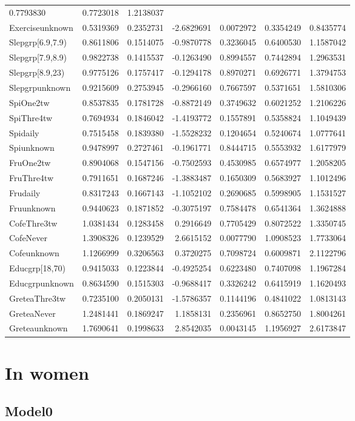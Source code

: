 \documentclass[]{article}
\begin{document}
\begin{longtable}[]{@{}lrrrrrr@{}}
0.7793830 & 0.7723018 & 1.2138037\tabularnewline
Exerciseunknown & 0.5319369 & 0.2352731 & -2.6829691 & 0.0072972 &
0.3354249 & 0.8435774\tabularnewline
Slepgrp{[}6.9,7.9) & 0.8611806 & 0.1514075 & -0.9870778 & 0.3236045 &
0.6400530 & 1.1587042\tabularnewline
Slepgrp{[}7.9,8.9) & 0.9822738 & 0.1415537 & -0.1263490 & 0.8994557 &
0.7442894 & 1.2963531\tabularnewline
Slepgrp{[}8.9,23) & 0.9775126 & 0.1757417 & -0.1294178 & 0.8970271 &
0.6926771 & 1.3794753\tabularnewline
Slepgrpunknown & 0.9215609 & 0.2753945 & -0.2966160 & 0.7667597 &
0.5371651 & 1.5810306\tabularnewline
SpiOne2tw & 0.8537835 & 0.1781728 & -0.8872149 & 0.3749632 & 0.6021252 &
1.2106226\tabularnewline
SpiThre4tw & 0.7694934 & 0.1846042 & -1.4193772 & 0.1557891 & 0.5358824
& 1.1049439\tabularnewline
Spidaily & 0.7515458 & 0.1839380 & -1.5528232 & 0.1204654 & 0.5240674 &
1.0777641\tabularnewline
Spiunknown & 0.9478997 & 0.2727461 & -0.1961771 & 0.8444715 & 0.5553932
& 1.6177979\tabularnewline
FruOne2tw & 0.8904068 & 0.1547156 & -0.7502593 & 0.4530985 & 0.6574977 &
1.2058205\tabularnewline
FruThre4tw & 0.7911651 & 0.1687246 & -1.3883487 & 0.1650309 & 0.5683927
& 1.1012496\tabularnewline
Frudaily & 0.8317243 & 0.1667143 & -1.1052102 & 0.2690685 & 0.5998905 &
1.1531527\tabularnewline
Fruunknown & 0.9440623 & 0.1871852 & -0.3075197 & 0.7584478 & 0.6541364
& 1.3624888\tabularnewline
CofeThre3tw & 1.0381434 & 0.1283458 & 0.2916649 & 0.7705429 & 0.8072522
& 1.3350745\tabularnewline
CofeNever & 1.3908326 & 0.1239529 & 2.6615152 & 0.0077790 & 1.0908523 &
1.7733064\tabularnewline
Cofeunknown & 1.1266999 & 0.3206563 & 0.3720275 & 0.7098724 & 0.6009871
& 2.1122796\tabularnewline
Educgrp{[}18,70) & 0.9415033 & 0.1223844 & -0.4925254 & 0.6223480 &
0.7407098 & 1.1967284\tabularnewline
Educgrpunknown & 0.8634590 & 0.1515303 & -0.9688417 & 0.3326242 &
0.6415919 & 1.1620493\tabularnewline
GreteaThre3tw & 0.7235100 & 0.2050131 & -1.5786357 & 0.1144196 &
0.4841022 & 1.0813143\tabularnewline
GreteaNever & 1.2481441 & 0.1869247 & 1.1858131 & 0.2356961 & 0.8652750
& 1.8004261\tabularnewline
Greteaunknown & 1.7690641 & 0.1998633 & 2.8542035 & 0.0043145 &
1.1956927 & 2.6173847\tabularnewline
\bottomrule
\end{longtable}

\hypertarget{in-women-1}{%
\section{In women}\label{in-women-1}}

\hypertarget{model0-3}{%
\subsection{Model0}\label{model0-3}}
\end{document}

